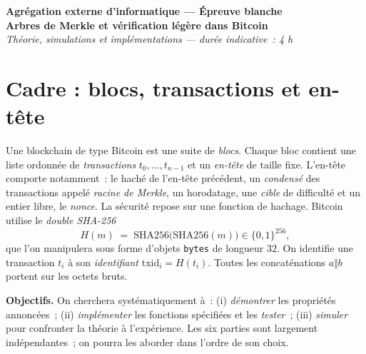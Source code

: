 \documentclass[11pt,a4paper]{article}
\begin{document}
\begin{center}
{\large\bfseries Agrégation externe d'informatique --- Épreuve blanche}\\[3pt]
{\bfseries Arbres de Merkle et vérification légère dans Bitcoin}\\[2pt]
{\small\itshape Théorie, simulations et implémentations --- durée indicative~: 4 h}
\end{center}

\vspace{-0.2em}
\begin{center}\footnotesize
{}
\end{center}

\section{Cadre : blocs, transactions et en-tête}

Une blockchain de type Bitcoin est une suite de \emph{blocs}. Chaque bloc contient une liste
ordonnée de \emph{transactions} $t_0,\dots,t_{n-1}$ et un \emph{en-tête} de taille fixe. L'en-tête
comporte notamment~: le haché de l'en-tête précédent, un \emph{condensé} des transactions appelé
\emph{racine de Merkle}, un horodatage, une \emph{cible} de difficulté et un entier libre, le
\emph{nonce}. La sécurité repose sur une fonction de hachage. Bitcoin utilise le \emph{double
SHA-256}
\[
  H(m) \;=\; \mathrm{SHA256}\bigl(\mathrm{SHA256}(m)\bigr) \in \{0,1\}^{256},
\]
que l'on manipulera sous forme d'objets \texttt{bytes} de longueur $32$. On identifie une
transaction $t_i$ à son \emph{identifiant} $\mathrm{txid}_i = H(t_i)$. Toutes les concaténations
$a\Vert b$ portent sur les octets bruts.

\textbf{Objectifs.} On cherchera systématiquement à~: (i) \emph{démontrer} les propriétés
annoncées~; (ii) \emph{implémenter} les fonctions spécifiées et les \emph{tester}~; (iii)
\emph{simuler} pour confronter la théorie à l'expérience. Les six parties sont largement
indépendantes~; on pourra les aborder dans l'ordre de son choix.
\end{document}
